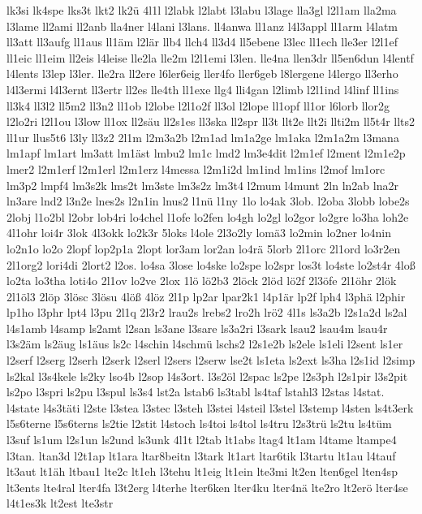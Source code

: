 {lk3si
lk4spe
lks3t
lkt2
lk2ü
4l1l
l2labk
l2labt
l3labu
l3lage
lla3gl
l2l1am
lla2ma
l3lame
ll2ami
ll2anb
lla4ner
l4lani
l3lans.
ll4anwa
ll1anz
l4l3appl
ll1arm
l4latm
ll3att
ll3aufg
ll1aus
ll1äm
l2lär
llb4
llch4
ll3d4
ll5ebene
l3lec
ll1ech
lle3er
l2l1ef
ll1eic
ll1eim
ll2eis
l4leise
lle2la
lle2m
l2l1emi
l3len.
lle4na
llen3dr
ll5en6dun
l4lentf
l4lents
l3lep
l3ler.
lle2ra
ll2ere
l6ler6eig
ller4fo
ller6geb
l8lergene
l4lergo
ll3erho
l4l3ermi
l4l3ernt
ll3ertr
ll2es
lle4th
ll1exe
llg4
lli4gan
l2limb
l2l1ind
l4linf
ll1ins
ll3k4
ll3l2
ll5m2
ll3n2
ll1ob
l2lobe
l2l1o2f
ll3ol
l2lope
ll1opf
ll1or
l6lorb
llor2g
l2lo2ri
l2l1ou
l3low
ll1ox
ll2säu
ll2s1es
ll3ska
ll2spr
ll3t
llt2e
llt2i
llti2m
ll5t4r
llts2
ll1ur
llus5t6
l3ly
ll3z2
2l1m
l2m3a2b
l2m1ad
lm1a2ge
lm1aka
l2m1a2m
l3mana
lm1apf
lm1art
lm3att
lm1äst
lmbu2
lm1c
lmd2
lm3e4dit
l2m1ef
l2ment
l2m1e2p
lmer2
l2m1erf
l2m1erl
l2m1erz
l4messa
l2m1i2d
lm1ind
lm1ins
l2mof
lm1orc
lm3p2
lmpf4
lm3s2k
lms2t
lm3ste
lm3s2z
lm3t4
l2mum
l4munt
2ln
ln2ab
lna2r
ln3are
lnd2
l3n2e
lnes2s
l2n1in
lnus2
l1nü
l1ny
1lo
lo4ak
3lob.
l2oba
3lobb
lobe2s
2lobj
l1o2bl
l2obr
lob4ri
lo4chel
l1ofe
lo2fen
lo4gh
lo2gl
lo2gor
lo2gre
lo3ha
loh2e
4l1ohr
loi4r
3lok
4l3okk
lo2k3r
5loks
l4ole
2l3o2ly
lomä3
lo2min
lo2ner
lo4nin
lo2n1o
lo2o
2lopf
lop2p1a
2lopt
lor3am
lor2an
lo4rä
5lorb
2l1orc
2l1ord
lo3r2en
2l1org2
lori4di
2lort2
l2os.
lo4sa
3lose
lo4ske
lo2spe
lo2spr
los3t
lo4ste
lo2st4r
4loß
lo2ta
lo3tha
loti4o
2l1ov
lo2ve
2lox
1lö
lö2b3
2löck
2löd
lö2f
2l3öfe
2l1öhr
2lök
2l1öl3
2löp
3lösc
3lösu
4löß
4löz
2l1p
lp2ar
lpar2k1
l4p1är
lp2f
lph4
l3phä
l2phir
lp1ho
l3phr
lpt4
l3pu
2l1q
2l3r2
lrau2s
lrebs2
lro2h
lrö2
4l1s
ls3a2b
l2s1a2d
ls2al
l4s1amb
l4samp
ls2amt
l2san
ls3ane
l3sare
ls3a2ri
l3sark
lsau2
lsau4m
lsau4r
l3s2äm
ls2äug
ls1äus
ls2c
l4schin
l4schmü
lschs2
l2s1e2b
ls2ele
ls1eli
l2sent
ls1er
l2serf
l2serg
l2serh
l2serk
l2serl
l2sers
l2serw
lse2t
ls1eta
ls2ext
ls3ha
l2s1id
l2simp
ls2kal
l3s4kele
ls2ky
lso4b
l2sop
l4s3ort.
l3s2öl
l2spac
ls2pe
l2s3ph
l2s1pir
l3s2pit
ls2po
l3spri
ls2pu
l3spul
ls3s4
lst2a
lstab6
ls3tabl
ls4taf
lstahl3
l2stas
l4stat.
l4state
l4s3täti
l2ste
l3stea
l3stec
l3steh
l3stei
l4steil
l3stel
l3stemp
l4sten
ls4t3erk
l5s6terne
l5s6terns
ls2tie
l2stit
l4stoch
ls4toi
ls4tol
ls4tru
l2s3trü
ls2tu
ls4tüm
l3suf
ls1um
l2s1un
ls2und
ls3unk
4l1t
l2tab
lt1abs
ltag4
lt1am
l4tame
ltampe4
l3tan.
ltan3d
l2t1ap
lt1ara
ltar8beitn
l3tark
lt1art
ltar6tik
l3tartu
lt1au
l4tauf
lt3aut
lt1äh
ltbau1
lte2c
lt1eh
l3tehu
lt1eig
lt1ein
lte3mi
lt2en
lten6gel
lten4sp
lt3ents
lte4ral
lter4fa
l3t2erg
l4terhe
lter6ken
lter4ku
lter4nä
lte2ro
lt2erö
lter4se
l4t1es3k
lt2est
lte3str
}
